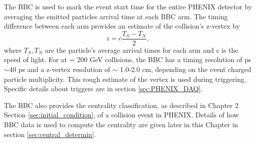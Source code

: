 The BBC is used to mark the event start time for the entire PHENIX detector by averaging the emitted particles arrival time at each BBC arm. The timing difference between each arm provides an estimate of the collision's z-vertex by
\begin{equation}
z = c \frac{T_S - T_N}{2},
\end{equation}
where $T_S, T_N$ are the particle's average arrival times for each arm and $c$ is the speed of light.%
For \pau at \sqsn = 200 GeV collisions, the BBC has a timing resolution of ps $\sim$40 ps and a z-vertex resolution of $\sim$ 1.0-2.0 cm, depending on the event charged particle multiplicity. This rough estimate of the vertex is used during triggering. Specific details about triggers are in section \ref{sec:PHENIX_DAQ}.

The BBC also provides the centrality classification, as described in Chapter 2 Section \ref{sec:initial_condition}, of a collision event in PHENIX. Details of how BBC data is used to compute the centrality are given later in this Chapter in section \ref{sec:central_determin}.

